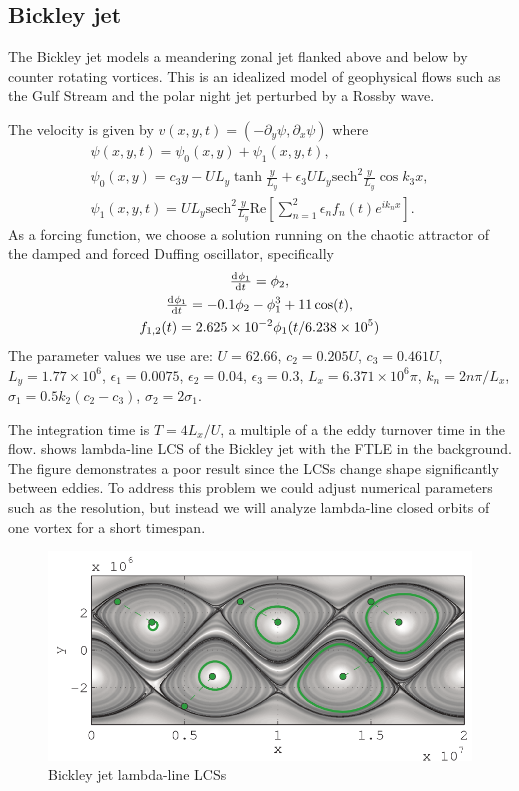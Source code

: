 \documentclass{elsarticle}
\begin{document}
\subsection{Bickley jet}

The Bickley jet models a meandering zonal jet flanked above and below by
counter rotating vortices. This is an idealized model of geophysical flows such as the Gulf Stream and the polar night jet perturbed by a Rossby wave\citep{castilloNegrete93:_chaot_rossb,beron-vera10:_invar_lagran}.

The velocity is given by $v(x,y,t) = (-\partial_y \psi, \partial_x \psi)$ where
\begin{gather*}
\psi(x,y,t) = \psi_0(x,y) + \psi_1(x,y,t),\\
\psi_0(x,y) = c_3 y - U L_y \tanh\frac{y}{L_y} + \epsilon_3 U L_y \mathrm{sech}^2\frac{y}{L_y} \cos k_3 x,\\
\psi_1(x,y,t) = U L_y \mathrm{sech}^2\frac{y}{L_y} \mathrm{Re}\left[ \sum_{n=1}^2 \epsilon_n f_n(t) e^{i k_n x}\right].
\end{gather*}
As a forcing function, we choose a solution running on the chaotic attractor of the damped and forced Duffing oscillator, specifically
\begin{gather*}
\od{\phi_1}{t} = \phi_2,\\
\od{\phi_1}{t} = -0.1 \phi_2 - \phi_1^3 + 11 \cos(t),\\
f_{1,2}(t) = 2.625 \times 10^{-2} \phi_1(t/6.238 \times 10^5)
\end{gather*}
The parameter values we use are: $U = 62.66$, $c_2 = 0.205 U$, $c_3 = 0.461 U$, $L_y = 1.77 \times 10^6$, $\epsilon_1 = 0.0075$, $\epsilon_2 = 0.04$, $\epsilon_3 = 0.3$, $L_x = 6.371 \times 10^6 \pi$, $k_n = 2 n \pi/L_x$, $\sigma_1 = 0.5 k_2 (c_2 - c_3)$, $\sigma_2 = 2 \sigma_1$.

The integration time is $T=4L_x/U$, a multiple of a the eddy turnover
time in the flow.  shows lambda-line LCS of the Bickley jet with the FTLE in the background. The figure demonstrates a poor result since the LCSs change shape significantly between eddies. To address this problem we could adjust numerical parameters such as the resolution, but instead we will analyze lambda-line closed orbits of one vortex for a short timespan.

\begin{figure}
\centering
\includegraphics[width=.85\textwidth]{graphics/bickley_jet/lambda_lcs_full}
\caption{Bickley jet lambda-line LCSs}
\label{fig:Bickley_jet_lambda_LCS_full}
\end{figure}
\end{document}
